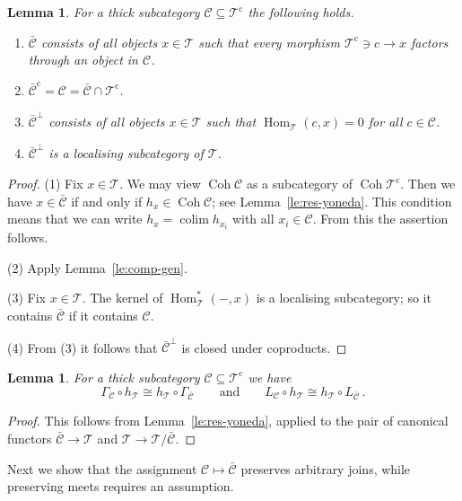 \documentclass{amsart}[a4]
\newtheorem{lemma}[theorem]{Lemma}
\theoremstyle{definition}
\theoremstyle{remark}
\numberwithin{equation}{section}
\newcommand{\Coh}{\operatorname{Coh}}
\newcommand{\colim}{\operatorname{colim}}
\newcommand{\Hom}{\operatorname{Hom}}
\newcommand{\cat}{\mathcal}
\let\Gamma\varGamma
\begin{document}
\begin{lemma}\label{le:loc-comp-gen}
For a thick subcategory  $\cat C\subseteq\cat T^{\mathrm c}$ the following holds.
\begin{enumerate}
\item $\bar{\cat C}$ consists of all objects $x\in\cat T$ such that every morphism
  $\cat T^{\mathrm c}\ni c\to x$ factors through an object in $\cat C$.
\item $\bar{\cat C}^{\mathrm c}=\cat C=\bar{\cat C}\cap\cat T^{\mathrm c}$.     
\item $\bar{\cat C}^\perp$ consists of all objects $x\in\cat T$ such that $\Hom_\cat T(c,x)=0$ for all
  $c\in\cat C$.
\item $\bar{\cat C}^\perp$ is a localising subcategory of $\cat T$.
\end{enumerate}
\end{lemma}
      
\begin{proof}
  (1) Fix $x\in \cat T$. We may view $\Coh\cat C$ as a subcategory of
  $\Coh\cat T^{\mathrm c}$. Then we have $x\in\bar{\cat C}$ if and only if
  $h_x\in\Coh\cat C$; see Lemma~\ref{le:res-yoneda}. This condition
  means that we can write $h_x=\colim h_{x_i}$ with all
  $x_i\in\cat C$. From this the assertion follows.

(2) Apply Lemma~\ref{le:comp-gen}. 

(3) Fix $x\in \cat T$. The kernel of $\Hom^*_\cat T(-,x)$ is a
localising subcategory; so it contains $\bar{\cat C}$ if it contains
$\cat C$.

(4) From (3) it follows that $\bar{\cat C}^\perp$ is closed under
coproducts.
\end{proof}

\begin{lemma}\label{le:loc-commute}
For  a thick subcategory
$\cat C\subseteq\cat T^{\mathrm c}$ we have
\[\Gamma_{\cat C}\circ h_\cat T\cong h_\cat T\circ\Gamma_{\bar{\cat
  C}}\qquad\text{and}\qquad
  L_{\cat C}\circ h_\cat T\cong h_\cat T\circ L_{\bar{\cat C}}\, .\]
\end{lemma}
\begin{proof}
This follows from Lemma~\ref{le:res-yoneda}, applied to the pair of canonical functors
$\bar{\cat C}\to\cat T$ and $\cat T\to \cat T/\bar{\cat C}$.
\end{proof}

Next we show that the assignment $\cat C\mapsto\bar{\cat C}$ preserves
arbitrary joins, while preserving meets requires an assumption.
\end{document}

